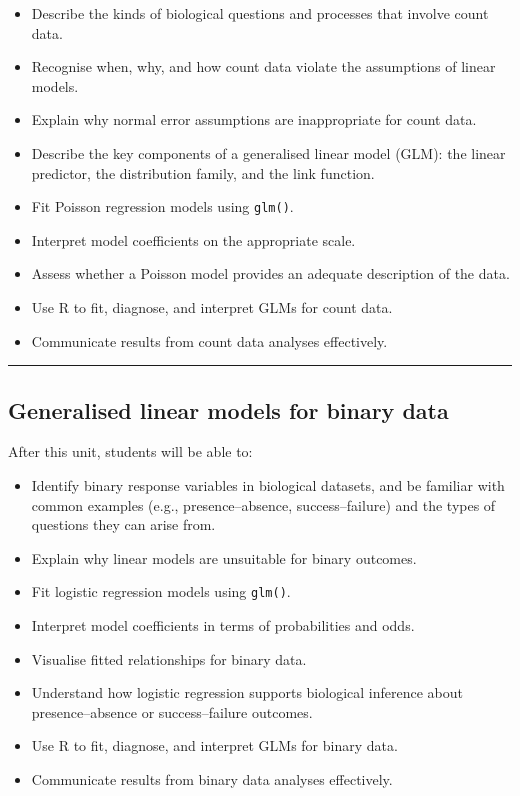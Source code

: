 \documentclass[
  letterpaper,
  8pt,
  a4paper]{book}
\providecommand{\tightlist}{%
  \setlength{\itemsep}{0pt}\setlength{\parskip}{0pt}}
\begin{document}
\begin{itemize}
\tightlist
\item
  Describe the kinds of biological questions and processes that involve
  count data.
\item
  Recognise when, why, and how count data violate the assumptions of
  linear models.
\item
  Explain why normal error assumptions are inappropriate for count data.
\item
  Describe the key components of a generalised linear model (GLM): the
  linear predictor, the distribution family, and the link function.
\item
  Fit Poisson regression models using \texttt{glm()}.
\item
  Interpret model coefficients on the appropriate scale.
\item
  Assess whether a Poisson model provides an adequate description of the
  data.
\item
  Use R to fit, diagnose, and interpret GLMs for count data.
\item
  Communicate results from count data analyses effectively.
\end{itemize}

\begin{center}\rule{0.5\linewidth}{0.5pt}\end{center}

\subsection*{Generalised linear models for binary
data}\label{generalised-linear-models-for-binary-data}

After this unit, students will be able to:

\begin{itemize}
\tightlist
\item
  Identify binary response variables in biological datasets, and be
  familiar with common examples (e.g., presence--absence,
  success--failure) and the types of questions they can arise from.
\item
  Explain why linear models are unsuitable for binary outcomes.
\item
  Fit logistic regression models using \texttt{glm()}.
\item
  Interpret model coefficients in terms of probabilities and odds.
\item
  Visualise fitted relationships for binary data.
\item
  Understand how logistic regression supports biological inference about
  presence--absence or success--failure outcomes.
\item
  Use R to fit, diagnose, and interpret GLMs for binary data.
\item
  Communicate results from binary data analyses effectively.
\end{itemize}
\end{document}
